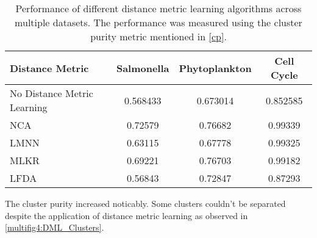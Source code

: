 \documentclass[12pt,a4paper]{article}
\begin{document}
\begin{table}[h]
\small
\centering
\caption{Performance of different distance metric learning algorithms across multiple datasets. The performance was measured using the cluster purity metric mentioned in \ref{cp}.}
\label{tab:performanceofDML}
\begin{tabular}{lccc}
\hline
\textbf{Distance Metric} & \textbf{Salmonella} & \textbf{Phytoplankton} & \textbf{Cell Cycle} \\
\hline
No Distance Metric Learning & 0.568433 & 0.673014 & 0.852585 \\
NCA & 0.72579 & 0.76682 & 0.99339 \\
LMNN & 0.63115 & 0.67778 & 0.99325 \\
MLKR & 0.69221 & 0.76703 & 0.99182 \\
LFDA & 0.56843 & 0.72847 & 0.87293 \\
\hline
\end{tabular}
\end{table}




The cluster purity increased noticably. Some clusters couldn't be separated despite the application of distance metric learning as observed in \ref{multifig4:DML_Clusters}.
\end{document}
